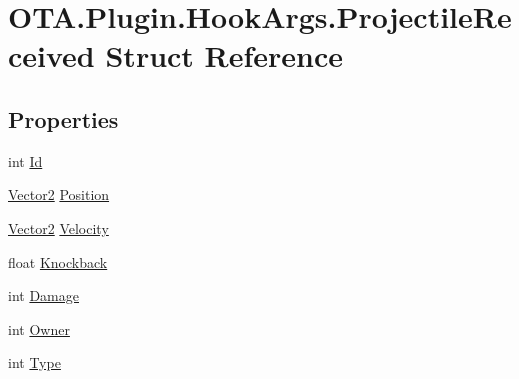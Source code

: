 \hypertarget{struct_o_t_a_1_1_plugin_1_1_hook_args_1_1_projectile_received}{}\section{O\+T\+A.\+Plugin.\+Hook\+Args.\+Projectile\+Received Struct Reference}
\label{struct_o_t_a_1_1_plugin_1_1_hook_args_1_1_projectile_received}
\subsection*{Properties}
\begin{DoxyCompactItemize}
\item 
int \hyperlink{struct_o_t_a_1_1_plugin_1_1_hook_args_1_1_projectile_received_a9a71a9863c93c296dcf6f310c60081c3}{Id}
\item 
\hyperlink{struct_microsoft_1_1_xna_1_1_framework_1_1_vector2}{Vector2} \hyperlink{struct_o_t_a_1_1_plugin_1_1_hook_args_1_1_projectile_received_a2213122652751458fa0cfe4246674503}{Position}
\item 
\hyperlink{struct_microsoft_1_1_xna_1_1_framework_1_1_vector2}{Vector2} \hyperlink{struct_o_t_a_1_1_plugin_1_1_hook_args_1_1_projectile_received_a64f5549e2da87945f46a2030e81f0fa8}{Velocity}
\item 
float \hyperlink{struct_o_t_a_1_1_plugin_1_1_hook_args_1_1_projectile_received_ac81c3ae6adaa5f404f77a5cb503acdde}{Knockback}
\item 
int \hyperlink{struct_o_t_a_1_1_plugin_1_1_hook_args_1_1_projectile_received_acf89d213e89e397c6a44243dbc49d6d9}{Damage}
\item 
int \hyperlink{struct_o_t_a_1_1_plugin_1_1_hook_args_1_1_projectile_received_a84632ef3dfe70fd50ae4b01d97eaf2af}{Owner}
\item 
int \hyperlink{struct_o_t_a_1_1_plugin_1_1_hook_args_1_1_projectile_received_a262d29a207852f3226bfa476464b4a39}{Type}

\end{DoxyCompactItemize}
